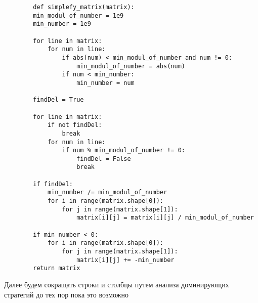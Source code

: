 \documentclass{article}
\begin{document}
\begin{listing}[H]
    \begin{verbatim}
        def simplefy_matrix(matrix):
        min_modul_of_number = 1e9
        min_number = 1e9

        for line in matrix:
            for num in line:
                if abs(num) < min_modul_of_number and num != 0:
                    min_modul_of_number = abs(num)
                if num < min_number:
                    min_number = num
        
        findDel = True

        for line in matrix:
            if not findDel:
                break
            for num in line:
                if num % min_modul_of_number != 0:
                    findDel = False
                    break
        
        if findDel:
            min_number /= min_modul_of_number
            for i in range(matrix.shape[0]):
                for j in range(matrix.shape[1]):
                    matrix[i][j] = matrix[i][j] / min_modul_of_number
        
        if min_number < 0:
            for i in range(matrix.shape[0]):
                for j in range(matrix.shape[1]):
                    matrix[i][j] += -min_number
        return matrix
    \end{verbatim}
\end{listing}

Далее будем сокращать строки и столбцы путем анализа доминирующих стратегий до тех пор пока это возможно
\end{document}
